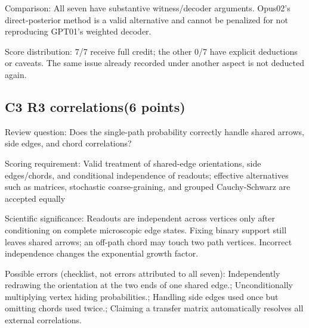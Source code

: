 \documentclass[11pt,a4paper]{article}
\begin{document}
Comparison: All seven have substantive witness/\allowbreak{}decoder arguments. Opus02’s direct-posterior method is a valid alternative and cannot be penalized for not reproducing GPT01’s weighted decoder.

Score distribution: 7/\allowbreak{}7 receive full credit; the other 0/\allowbreak{}7 have explicit deductions or caveats. The same issue already recorded under another aspect is not deducted again.

\clearpage
\subsection{C3 R3 correlations(6 points)}
\label{aspect:C3}
Review question: Does the single-path probability correctly handle shared arrows,\allowbreak{} side edges,\allowbreak{} and chord correlations?

Scoring requirement: Valid treatment of shared-edge orientations,\allowbreak{} side edges/\allowbreak{}chords,\allowbreak{} and conditional independence of readouts; effective alternatives such as matrices,\allowbreak{} stochastic coarse-graining,\allowbreak{} and grouped Cauchy-Schwarz are accepted equally

Scientific significance: Readouts are independent across vertices only after conditioning on complete microscopic edge states. Fixing binary support still leaves shared arrows; an off-path chord may touch two path vertices. Incorrect independence changes the exponential growth factor.

Possible errors (checklist,\allowbreak{} not errors attributed to all seven): Independently redrawing the orientation at the two ends of one shared edge.; Unconditionally multiplying vertex hiding probabilities.; Handling side edges used once but omitting chords used twice.; Claiming a transfer matrix automatically resolves all external correlations.
\end{document}
